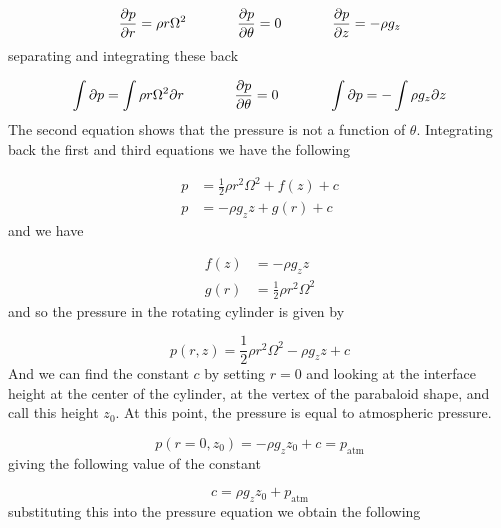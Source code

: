\begin{equation*}
  \frac{\partial{}p}{\partial{}r}=\rho{}r\Omega^{2}
  \hspace{0.5in}
  \frac{\partial{}p}{\partial\theta}=0
  \hspace{0.5in}
  \frac{\partial{}p}{\partial{}z}=-\rho{}g_{z}
\end{equation*}
separating and integrating these back

\begin{equation*}
  \int\partial{}p=\int\rho{}r\Omega^{2}\partial{}r
  \hspace{0.5in}
  \frac{\partial{}p}{\partial\theta}=0
  \hspace{0.5in}
  \int\partial{}p=-\int\rho{}g_{z}\partial{}z
\end{equation*}
The second equation shows that the pressure is not a function of $\theta$.
Integrating back the first and third equations we have the following

\begin{equation*}
  \begin{split}
    p&=\frac{1}{2}\rho{}r^{2}\Omega^{2}+f(z)+c \\
    p&=-\rho{}g_{z}z+g(r)+c
  \end{split}
\end{equation*}
and we have

\begin{equation*}
  \begin{split}
    f(z)&=-\rho{}g_{z}z \\
    g(r)&=\frac{1}{2}\rho{}r^{2}\Omega^{2}
  \end{split}
\end{equation*}
and so the pressure in the rotating cylinder is given by

\begin{equation*}
  p(r,z)=\frac{1}{2}\rho{}r^{2}\Omega^{2}-\rho{}g_{z}z+c
\end{equation*}
And we can find the constant $c$ by setting $r=0$ and looking at the interface height at the center of the cylinder, at the vertex of the parabaloid shape, and call this height $z_{0}$.
At this point, the pressure is equal to atmospheric pressure.

\begin{equation*}
  p(r=0,z_{0})=-\rho{}g_{z}z_{0}+c=p_{\text{atm}}
\end{equation*}
giving the following value of the constant

\begin{equation*}
  c=\rho{}g_{z}z_{0}+p_{\text{atm}}
\end{equation*}
substituting this into the pressure equation we obtain the following

